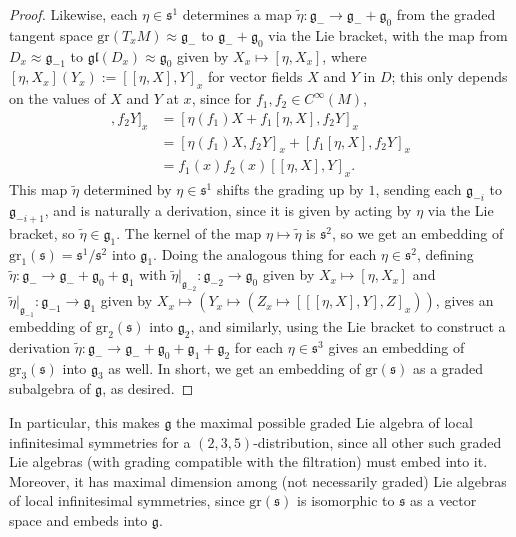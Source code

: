 \documentclass[12pt,a4paper]{amsart}
\theoremstyle{definition}
\begin{document}
\begin{proof}
Likewise, each $\eta\in\mathfrak{s}^1$ determines a map $\tilde{\eta}:\mathfrak{g}_-\to\mathfrak{g}_-+\mathfrak{g}_0$ from the graded tangent space $\mathrm{gr}(T_xM)\approx\mathfrak{g}_-$ to $\mathfrak{g}_-+\mathfrak{g}_0$ via the Lie bracket, with the map from $D_x\approx\mathfrak{g}_{-1}$ to $\mathfrak{gl}(D_x)\approx\mathfrak{g}_0$ given by $X_x\mapsto[\eta,X_x]$, where $[\eta,X_x](Y_x):=[[\eta,X],Y]_x$ for vector fields $X$ and $Y$ in $D$; this only depends on the values of $X$ and $Y$ at $x$, since for $f_1,f_2\in C^\infty(M)$,
\begin{align*}[[\eta,f_1X],f_2Y]_x & =[\eta(f_1)X+f_1[\eta,X],f_2Y]_x \\ & =[\eta(f_1)X,f_2Y]_x+[f_1[\eta,X],f_2Y]_x \\ & =f_1(x)f_2(x)[[\eta,X],Y]_x.\end{align*}
This map $\tilde{\eta}$ determined by $\eta\in\mathfrak{s}^1$ shifts the grading up by $1$, sending each $\mathfrak{g}_{-i}$ to $\mathfrak{g}_{-i+1}$, and is naturally a derivation, since it is given by acting by $\eta$ via the Lie bracket, so $\tilde{\eta}\in\mathfrak{g}_1$. The kernel of the map $\eta\mapsto\tilde{\eta}$ is $\mathfrak{s}^2$, so we get an embedding of $\mathrm{gr}_1(\mathfrak{s})=\mathfrak{s}^1/\mathfrak{s}^2$ into $\mathfrak{g}_1$. Doing the analogous thing for each $\eta\in\mathfrak{s}^2$, defining $\tilde{\eta}:\mathfrak{g}_-\to\mathfrak{g}_-+\mathfrak{g}_0+\mathfrak{g}_1$ with $\tilde{\eta}|_{\mathfrak{g}_{-2}}:\mathfrak{g}_{-2}\to\mathfrak{g}_0$ given by $X_x\mapsto[\eta,X_x]$ and $\tilde{\eta}|_{\mathfrak{g}_{-1}}:\mathfrak{g}_{-1}\to\mathfrak{g}_1$ given by $X_x\mapsto(Y_x\mapsto(Z_x\mapsto[[[\eta,X],Y],Z]_x))$, gives an embedding of $\mathrm{gr}_2(\mathfrak{s})$ into $\mathfrak{g}_2$, and similarly, using the Lie bracket to construct a derivation $\tilde{\eta}:\mathfrak{g}_-\to\mathfrak{g}_-+\mathfrak{g}_0+\mathfrak{g}_1+\mathfrak{g}_2$ for each $\eta\in\mathfrak{s}^3$ gives an embedding of $\mathrm{gr}_3(\mathfrak{s})$ into $\mathfrak{g}_3$ as well. In short, we get an embedding of $\mathrm{gr}(\mathfrak{s})$ as a graded subalgebra of $\mathfrak{g}$, as desired.\mbox{\qedhere}\end{proof}

In particular, this makes $\mathfrak{g}$ the maximal possible graded Lie algebra of local infinitesimal symmetries for a $(2,3,5)$-distribution, since all other such graded Lie algebras (with grading compatible with the filtration) must embed into it. Moreover, it has maximal dimension among (not necessarily graded) Lie algebras of local infinitesimal symmetries, since $\mathrm{gr}(\mathfrak{s})$ is isomorphic to $\mathfrak{s}$ as a vector space and embeds into $\mathfrak{g}$.
\end{document}
